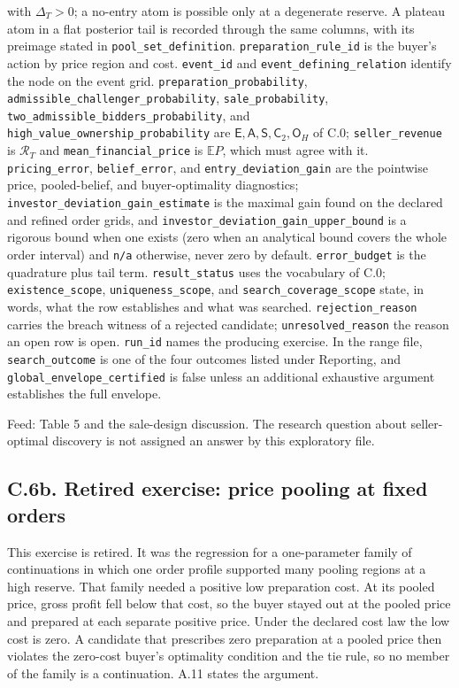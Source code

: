 \documentclass[
  11pt,
]{article}
\begin{document}
with \(\Delta_T>0\); a no-entry atom is possible only at a degenerate reserve.
A plateau atom in a flat posterior tail is recorded through the same columns,
with its preimage stated in \texttt{pool\_set\_definition}.
\texttt{preparation\_rule\_id} is the buyer's action by price region and
cost. \texttt{event\_id} and \texttt{event\_defining\_relation} identify
the node on the event grid. \texttt{preparation\_probability},
\texttt{admissible\_challenger\_probability},
\texttt{sale\_probability},
\texttt{two\_admissible\_bidders\_probability}, and
\texttt{high\_value\_ownership\_probability} are
\(\mathsf E,\mathsf A,\mathsf S,\mathsf C_2,\mathsf O_H\) of C.0;
\texttt{seller\_revenue} is \(\mathcal R_T\) and
\texttt{mean\_financial\_price} is \(\mathbb E P\), which must agree
with it. \texttt{pricing\_error}, \texttt{belief\_error}, and
\texttt{entry\_deviation\_gain} are the pointwise price, pooled-belief,
and buyer-optimality diagnostics;
\texttt{investor\_deviation\_gain\_estimate} is the maximal gain found
on the declared and refined order grids, and
\texttt{investor\_deviation\_gain\_upper\_bound} is a rigorous bound
when one exists (zero when an analytical bound covers the whole order
interval) and \texttt{n/a} otherwise, never zero by default.
\texttt{error\_budget} is the quadrature plus tail term.
\texttt{result\_status} uses the vocabulary of C.0;
\texttt{existence\_scope}, \texttt{uniqueness\_scope}, and
\texttt{search\_coverage\_scope} state, in words, what the row
establishes and what was searched. \texttt{rejection\_reason} carries
the breach witness of a rejected candidate; \texttt{unresolved\_reason}
the reason an open row is open. \texttt{run\_id} names the producing
exercise. In the range file, \texttt{search\_outcome} is one of the four
outcomes listed under Reporting, and
\texttt{global\_envelope\_certified} is false unless an additional
exhaustive argument establishes the full envelope.

Feed: Table 5 and the sale-design discussion. The research question
about seller-optimal discovery is not assigned an answer by this
exploratory file.

\subsection{C.6b. Retired exercise: price pooling at fixed orders}\label{oa-c-price-pools}

This exercise is retired. It was the regression for a one-parameter family of
continuations in which one order profile supported many pooling regions at a
high reserve. That family needed a positive low preparation cost.
At its pooled price, gross profit fell below that cost, so the
buyer stayed out at the pooled price and prepared at each separate positive price.
Under the declared cost law the low cost is zero. A candidate that prescribes
zero preparation at a pooled price then violates the zero-cost buyer's
optimality condition and the tie rule, so no member of the family is a
continuation.
A.11 states the argument.
\end{document}
